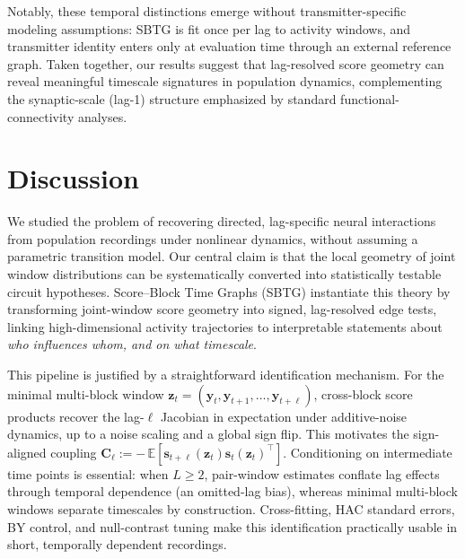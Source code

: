 \documentclass{article}
\theoremstyle{plain}
\theoremstyle{definition}
\theoremstyle{remark}
\newcommand{\E}{\mathbb{E}}
\newcommand{\1}{\mathbf{1}}
\newcommand{\y}{\bm{y}}
\newcommand{\z}{\bm{z}}
\newcommand{\s}{\bm{s}}
\begin{document}
Notably, these temporal distinctions emerge without transmitter-specific modeling assumptions: SBTG is fit once per lag to activity windows, and transmitter identity enters only at evaluation time through an external reference graph. Taken together, our results suggest that lag-resolved score geometry can reveal meaningful timescale signatures in population dynamics, complementing the synaptic-scale (lag-1) structure emphasized by standard functional-connectivity analyses.


\section{Discussion}
\label{sec:discussion}

We studied the problem of recovering directed, lag-specific neural interactions from population recordings under nonlinear dynamics, without assuming a parametric transition model. Our central claim is that the local geometry of joint window distributions can be systematically converted into statistically testable circuit hypotheses. Score--Block Time Graphs (SBTG) instantiate this theory by transforming joint-window score geometry into signed, lag-resolved edge tests, linking high-dimensional activity trajectories to interpretable statements about \emph{who influences whom, and on what timescale}.

This pipeline is justified by a straightforward identification mechanism. For the minimal multi-block window $\z_t=(\y_t,\y_{t+1},\ldots,\y_{t+\ell})$, cross-block score products recover the lag-$\ell$ Jacobian in expectation under additive-noise dynamics, up to a noise scaling and a global sign flip. This motivates the sign-aligned coupling $\bm{C}_\ell := -\,\E[\s_{t+\ell}(\z_t)\s_t(\z_t)^\top]$. Conditioning on intermediate time points is essential: when $L\ge2$, pair-window estimates conflate lag effects through temporal dependence (an omitted-lag bias), whereas minimal multi-block windows separate timescales by construction. Cross-fitting, HAC standard errors, BY control, and null-contrast tuning make this identification practically usable in short, temporally dependent recordings.
\end{document}
